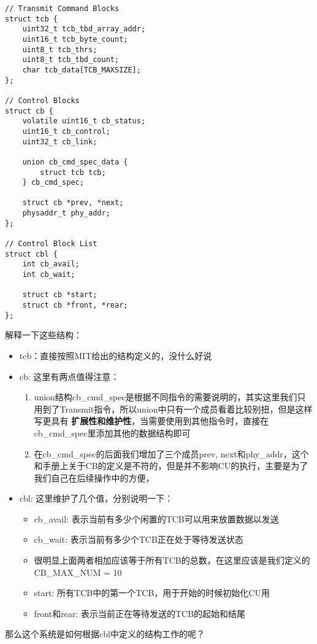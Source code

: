 \documentclass{article}
\newcommand{\highlight}[1]{{\bfseries \color{red}  #1}}
\begin{document}
\begin{CJK*}{UTF8}{gkai}
\begin{lstlisting}[style=ccode, title={\scriptsize \ttfamily \bfseries kern/e100.h}]
// Transmit Command Blocks
struct tcb {
    uint32_t tcb_tbd_array_addr;
    uint16_t tcb_byte_count;
    uint8_t tcb_thrs;
    uint8_t tcb_tbd_count;
    char tcb_data[TCB_MAXSIZE];
};

// Control Blocks
struct cb {
    volatile uint16_t cb_status;
    uint16_t cb_control;
    uint32_t cb_link;

    union cb_cmd_spec_data {
        struct tcb tcb;
    } cb_cmd_spec;

    struct cb *prev, *next;
    physaddr_t phy_addr;   
};

// Control Block List
struct cbl {
    int cb_avail;
    int cb_wait;

    struct cb *start;
    struct cb *front, *rear;
};
\end{lstlisting}

解释一下这些结构：

\begin{itemize}
\item{tcb：直接按照MIT给出的结构定义的，没什么好说}
\item{cb: 这里有两点值得注意：
\begin{enumerate}
\item{union结构cb\_cmd\_spec是根据不同指令的需要说明的，其实这里我们只用到了Transmit指令，所以union中只有一个成员看着比较别扭，但是这样写更具有\highlight{扩展性和维护性}，当需要使用到其他指令时，直接在cb\_cmd\_spec里添加其他的数据结构即可}
\item{在cb\_cmd\_spec的后面我们增加了三个成员prev, next和phy\_addr，这个和手册上关于CB的定义是不符的，但是并不影响CU的执行，主要是为了我们自己在后续操作中的方便，}
\end{enumerate}
}
\item{cbl: 这里维护了几个值，分别说明一下：
\begin{itemize}
\item{cb\_avail: 表示当前有多少个闲置的TCB可以用来放置数据以发送}
\item{cb\_wait: 表示当前有多少个TCB正在处于等待发送状态}
\item{很明显上面两者相加应该等于所有TCB的总数，在这里应该是我们定义的CB\_MAX\_NUM = 10}
\item{start: 所有TCB中的第一个TCB，用于开始的时候初始化CU用}
\item{front和rear: 表示当前正在等待发送的TCB的起始和结尾}

\end{itemize}
}
\end{itemize}

那么这个系统是如何根据cbl中定义的结构工作的呢？


\end{CJK*}
\end{document}
